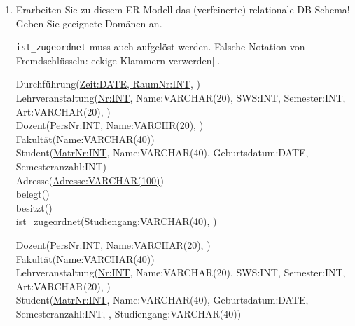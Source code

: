 \documentclass{lehramt-informatik}
\begin{document}
\renewcommand{\labelenumi}{(\alph{enumi})}
\begin{enumerate}
\item Erarbeiten Sie zu diesem ER-Modell das (verfeinerte) relationale
DB-Schema! Geben Sie geeignete Domänen an.

\begin{antwort}[falsch]
\texttt{ist\_zugeordnet} muss auch aufgelöst
werden. Falsche Notation von Fremdschlüsseln: eckige Klammern
verwerden[].

\ttfamily
\footnotesize
Durchführung(\underline{Zeit:DATE, RaumNr:INT}, )\\

Lehrveranstaltung(\underline{Nr:INT}, Name:VARCHAR(20), SWS:INT,
Semester:INT, Art:VARCHAR(20), )\\

Dozent(\underline{PersNr:INT}, Name:VARCHR(20),
)\\

Fakultät(\underline{Name:VARCHAR(40)})\\

Student(\underline{MatrNr:INT}, Name:VARCHAR(40), Geburtsdatum:DATE,
Semesteranzahl:INT)\\

Adresse(\underline{Adresse:VARCHAR(100)})\\

belegt()\\

besitzt()\\

ist\_zugeordnet(Studiengang:VARCHAR(40), )\\
\end{antwort}

\begin{antwort}[muster]
\ttfamily
\footnotesize
Dozent(\underline{PersNr:INT}, Name:VARCHAR(20),
)\\

Fakultät(\underline{Name:VARCHAR(40)})\\

Lehrveranstaltung(\underline{Nr:INT}, Name:VARCHAR(20), SWS:INT,
Semester:INT, Art:VARCHAR(20), )\\

Student(\underline{MatrNr:INT}, Name:VARCHAR(40), Geburtsdatum:DATE,
Semesteranzahl:INT, ,
Studiengang:VARCHAR(40))\\


\end{antwort}
\end{enumerate}
\end{document}

